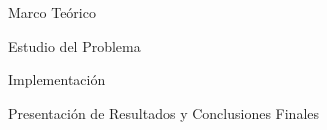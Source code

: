 \documentclass[a4paper,12pt]{report}
\begin{document}
\date{}

\maketitle{}

\newpage
\tableofcontents{}

\newpage
\listoffigures{}

\newpage
\listoftables{}


\newpage
\begin{part}{Marco Teórico}
\newpage
\newpage
\end{part}
\begin{part}{Estudio del Problema}
\newpage
\newpage
\newpage

\newpage
\newpage

\end{part}
\begin{part}{Implementación}
\newpage
\newpage
\end{part}
\begin{part}{Presentación de Resultados y Conclusiones Finales}
\newpage

\newpage

\newpage
\end{part}
\end{document}
